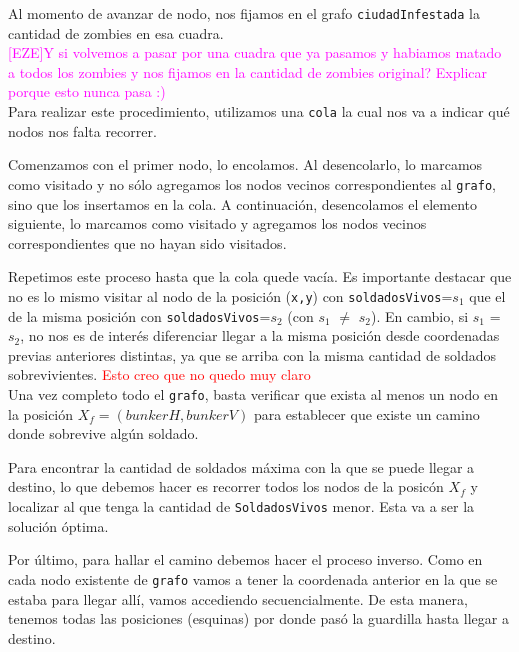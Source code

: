 Al momento de avanzar de nodo, nos fijamos en el grafo \texttt{ciudadInfestada} la cantidad de zombies en esa cuadra.\\


\textcolor{magenta}{[EZE]Y si volvemos a pasar por una cuadra que ya pasamos y habiamos matado a todos los zombies y nos fijamos en la cantidad de zombies original? Explicar porque esto nunca pasa :)}\\

Para realizar este procedimiento, utilizamos una \texttt{cola} la cual nos va a indicar qu\'e nodos nos falta recorrer.

Comenzamos con el primer nodo, lo encolamos. Al desencolarlo, lo marcamos como visitado y no s\'olo agregamos los nodos vecinos correspondientes al \texttt{grafo}, sino que los insertamos en la cola. A continuaci\'on, desencolamos el elemento siguiente, lo marcamos como visitado y agregamos los nodos vecinos correspondientes que no hayan sido visitados.

Repetimos este proceso hasta que la cola quede vac\'ia. Es importante destacar que no es lo mismo visitar al nodo de la posici\'on (\texttt{x,y}) con \texttt{soldadosVivos}=$s_1$ que el de la misma posici\'on con \texttt{soldadosVivos}=$s_2$ (con $s_1$ $\neq$ $s_2$).
En cambio, si $s_1$ = $s_2$, no nos es de inter\'es diferenciar llegar a la misma posici\'on desde coordenadas previas anteriores distintas, ya que se arriba con la misma cantidad de soldados sobrevivientes. \textcolor{red}{Esto creo que no quedo muy claro}\\

Una vez completo todo el \texttt{grafo}, basta verificar que exista al menos un nodo en la posici\'on $X_f = (bunkerH, bunkerV)$ para establecer que existe un camino donde sobrevive alg\'un soldado.

Para encontrar la cantidad de soldados m\'axima con la que se puede llegar a destino, lo que debemos hacer es recorrer todos los nodos de la posic\'on $X_f$ y localizar al que tenga la cantidad de \texttt{SoldadosVivos} menor. Esta va a ser la soluci\'on \'optima.

Por \'ultimo, para hallar el camino debemos hacer el proceso inverso. Como en cada nodo existente de \texttt{grafo} vamos a tener la coordenada anterior en la que se estaba para llegar all\'i, vamos accediendo secuencialmente. De esta manera, tenemos todas las posiciones (esquinas) por donde pas\'o la guardilla hasta llegar a destino.\\

